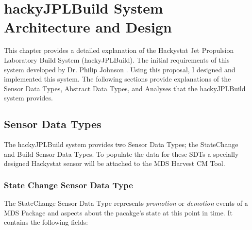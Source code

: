 
\chapter{hackyJPLBuild System Architecture and Design}

This chapter provides a detailed explanation of the Hackystat Jet
Propulsion Laboratory Build System (hackyJPLBuild).  The initial
requirements of this system developed by Dr. Philip Johnson
\cite{csdl2-02-03}.  Using this proposal, I designed and implemented this
system.  The following sections provide explanations of the Sensor Data
Types, Abstract Data Types, and Analyses that the hackyJPLBuild system
provides.

\section{Sensor Data Types}
The hackyJPLBuild system provides two Sensor Data Types; the StateChange
and Build Sensor Data Types.  To populate the data for these SDTs a
specially designed Hackystat sensor will be attached to the MDS Harvest CM
Tool.  


\subsection{State Change Sensor Data Type}
The StateChange Sensor Data Type represents \emph{promotion} or
\emph{demotion} events of a MDS Package and aspects about the pacakge's
state at this point in time.  It contains the following fields:


